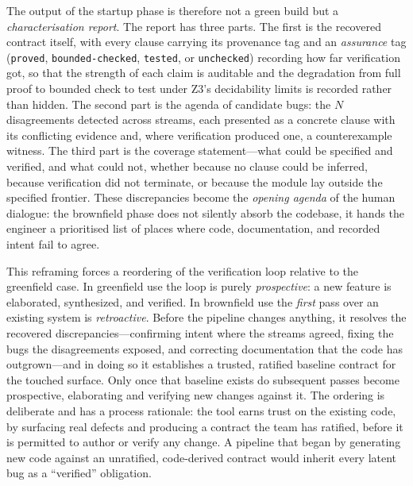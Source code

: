The output of the startup phase is therefore not a green build but a \emph{characterisation report}. The report has three parts. The first is the recovered contract itself, with every clause carrying its provenance tag and an \emph{assurance} tag (\texttt{proved}, \texttt{bounded-checked}, \texttt{tested}, or \texttt{unchecked}) recording how far verification got, so that the strength of each claim is auditable and the degradation from full proof to bounded check to test under Z3's decidability limits is recorded rather than hidden. The second part is the agenda of candidate bugs: the $N$ disagreements detected across streams, each presented as a concrete clause with its conflicting evidence and, where verification produced one, a counterexample witness. The third part is the coverage statement---what could be specified and verified, and what could not, whether because no clause could be inferred, because verification did not terminate, or because the module lay outside the specified frontier. These discrepancies become the \emph{opening agenda} of the human dialogue: the brownfield phase does not silently absorb the codebase, it hands the engineer a prioritised list of places where code, documentation, and recorded intent fail to agree.

This reframing forces a reordering of the verification loop relative to the greenfield case. In greenfield use the loop is purely \emph{prospective}: a new feature is elaborated, synthesized, and verified. In brownfield use the \emph{first} pass over an existing system is \emph{retroactive}. Before the pipeline changes anything, it resolves the recovered discrepancies---confirming intent where the streams agreed, fixing the bugs the disagreements exposed, and correcting documentation that the code has outgrown---and in doing so it establishes a trusted, ratified baseline contract for the touched surface. Only once that baseline exists do subsequent passes become prospective, elaborating and verifying new changes against it. The ordering is deliberate and has a process rationale: the tool earns trust on the existing code, by surfacing real defects and producing a contract the team has ratified, before it is permitted to author or verify any change. A pipeline that began by generating new code against an unratified, code-derived contract would inherit every latent bug as a ``verified'' obligation.


